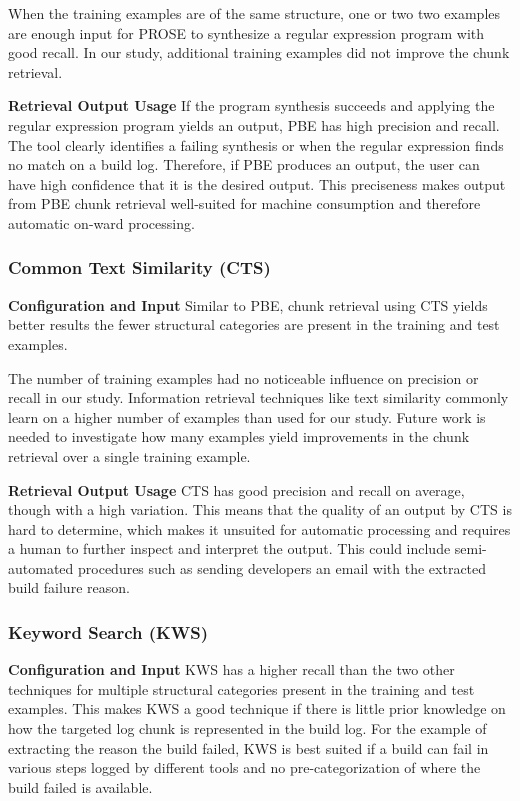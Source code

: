 When the training examples are of the same structure, one or two
two examples are enough input for PROSE to synthesize a regular
expression program with good recall.
In our study, additional training
examples did not improve the chunk retrieval.

\noindent
\textbf{Retrieval Output Usage}
If the program synthesis succeeds and applying the regular expression
program yields an output, PBE has high precision and recall.
The tool
clearly identifies a failing synthesis or when the regular expression
finds no match on a build log.
Therefore, if PBE produces
an output, the user can have high confidence that it is the desired
output.
This preciseness makes output from PBE chunk retrieval
well-suited for machine consumption and therefore automatic on-ward
processing.

\subsubsection{Common Text Similarity (CTS)}
\noindent
\textbf{Configuration and Input}
Similar to PBE, chunk retrieval using CTS yields better results the
fewer structural categories are present in the training and test
examples.

The number of training examples had no noticeable influence on
precision or recall in our study.
Information retrieval techniques
like text similarity commonly learn on a higher number of examples
than used for our study.
Future work is needed to investigate how many
examples yield improvements in the chunk retrieval over a single
training example.

\noindent
\textbf{Retrieval Output Usage}
CTS has good precision and recall on average, though with a high
variation.
This means that the quality of an output by CTS is hard to
determine, which makes it unsuited for automatic  processing and requires
a human to further inspect and interpret the output.
This could include semi-automated procedures such as sending
developers an email with the extracted build failure reason.

\subsubsection{Keyword Search (KWS)}
\noindent
\textbf{Configuration and Input}
KWS has a higher recall than the two other techniques for multiple
structural categories present in the training and test examples.
This
makes KWS a good technique if there is little prior knowledge on how
the targeted log chunk is represented in the build log.
For the
example of extracting the reason the build failed, KWS is best suited
if a build can fail in various steps logged by different tools and no
pre-categorization of where the build failed is available.

